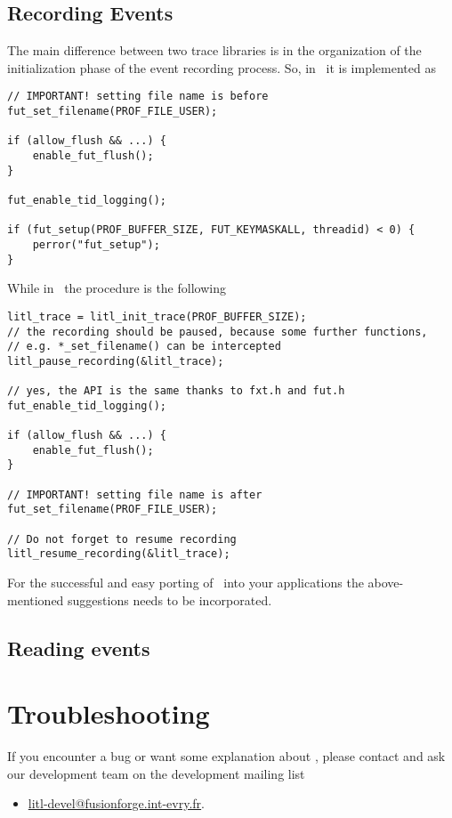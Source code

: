 \section{Recording Events}
The main difference between two trace libraries is in the organization of the
initialization phase of the event recording process. So, in \fxt\ it is 
implemented as
\begin{lstlisting}
// IMPORTANT! setting file name is before
fut_set_filename(PROF_FILE_USER);

if (allow_flush && ...) {
    enable_fut_flush();
}

fut_enable_tid_logging();

if (fut_setup(PROF_BUFFER_SIZE, FUT_KEYMASKALL, threadid) < 0) {
    perror("fut_setup");
}
\end{lstlisting}
While in \litl\ the procedure is the following
\begin{lstlisting}
litl_trace = litl_init_trace(PROF_BUFFER_SIZE);
// the recording should be paused, because some further functions, 
// e.g. *_set_filename() can be intercepted
litl_pause_recording(&litl_trace);

// yes, the API is the same thanks to fxt.h and fut.h
fut_enable_tid_logging();

if (allow_flush && ...) {
    enable_fut_flush();
}

// IMPORTANT! setting file name is after
fut_set_filename(PROF_FILE_USER);

// Do not forget to resume recording
litl_resume_recording(&litl_trace);
\end{lstlisting}

For the successful and easy porting of \litl\ into your applications the 
above-mentioned suggestions needs to be incorporated.

\section{Reading events}


    
\chapter{Troubleshooting}
If you encounter a bug or want some explanation about \litl{}, please contact 
and ask our development team on the development mailing list
\begin{itemize}
 \item \url{litl-devel@fusionforge.int-evry.fr}.
\end{itemize}



\cleardoublepage
{}
{}
\small

\normalsize


